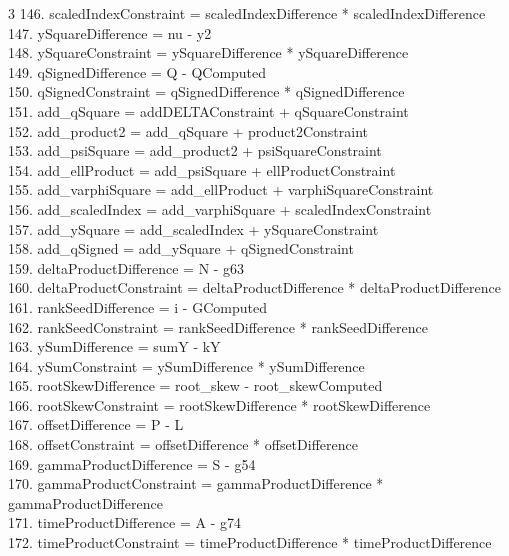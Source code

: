 \documentclass[10pt]{article}
\begin{document}
\begin{multicols}{3}
146. scaledIndexConstraint = scaledIndexDifference * scaledIndexDifference\\
147. ySquareDifference = nu - y2\\
148. ySquareConstraint = ySquareDifference * ySquareDifference\\
149. qSignedDifference = Q - QComputed\\
150. qSignedConstraint = qSignedDifference * qSignedDifference\\
151. add\_qSquare = addDELTAConstraint + qSquareConstraint\\
152. add\_product2 = add\_qSquare + product2Constraint\\
153. add\_psiSquare = add\_product2 + psiSquareConstraint\\
154. add\_ellProduct = add\_psiSquare + ellProductConstraint\\
155. add\_varphiSquare = add\_ellProduct + varphiSquareConstraint\\
156. add\_scaledIndex = add\_varphiSquare + scaledIndexConstraint\\
157. add\_ySquare = add\_scaledIndex + ySquareConstraint\\
158. add\_qSigned = add\_ySquare + qSignedConstraint\\
159. deltaProductDifference = N - g63\\
160. deltaProductConstraint = deltaProductDifference * deltaProductDifference\\
161. rankSeedDifference = i - GComputed\\
162. rankSeedConstraint = rankSeedDifference * rankSeedDifference\\
163. ySumDifference = sumY - kY\\
164. ySumConstraint = ySumDifference * ySumDifference\\
165. rootSkewDifference = root\_skew - root\_skewComputed\\
166. rootSkewConstraint = rootSkewDifference * rootSkewDifference\\
167. offsetDifference = P - L\\
168. offsetConstraint = offsetDifference * offsetDifference\\
169. gammaProductDifference = S - g54\\
170. gammaProductConstraint = gammaProductDifference * gammaProductDifference\\
171. timeProductDifference = A - g74\\
172. timeProductConstraint = timeProductDifference * timeProductDifference\\

\end{multicols}
\end{document}
